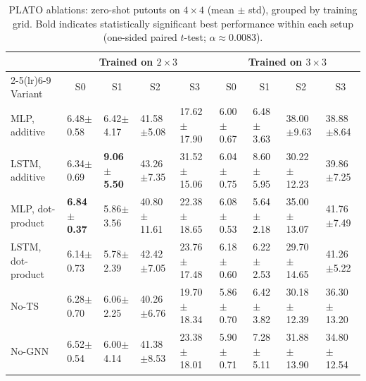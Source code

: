\begin{table}[h]
\centering
\small
\setlength{\tabcolsep}{1.4pt}
\renewcommand{\arraystretch}{1.02}
\begin{tabular}{@{\hspace{2pt}}l|l|l|l|l||l|l|l|l@{\hspace{2pt}}}
\toprule
& \multicolumn{4}{c||}{Trained on $2\times 3$} & \multicolumn{4}{c}{Trained on $3\times 3$} \\
\cmidrule(lr){2-5}\cmidrule(lr){6-9}
Variant & \multicolumn{1}{c|}{S0} & \multicolumn{1}{c|}{S1} & \multicolumn{1}{c|}{S2} & \multicolumn{1}{c||}{S3}
        & \multicolumn{1}{c|}{S0} & \multicolumn{1}{c|}{S1} & \multicolumn{1}{c|}{S2} & \multicolumn{1}{c}{S3} \\
\midrule
MLP, additive      & 6.48$\pm$0.58 & 6.42$\pm$4.17 & 41.58$\pm$5.08 & 17.62$\pm$17.90
                  & 6.00$\pm$0.67 & 6.48$\pm$3.63 & 38.00$\pm$9.63 & 38.88$\pm$8.64 \\
LSTM, additive     & 6.34$\pm$0.69 & \textbf{9.06$\pm$5.50} & 43.26$\pm$7.35 & 31.52$\pm$15.06
                  & 6.04$\pm$0.75 & 8.60$\pm$5.95 & 30.22$\pm$12.23 & 39.86$\pm$7.25 \\
MLP, dot-product   & \textbf{6.84$\pm$0.37} & 5.86$\pm$3.56 & 40.80$\pm$11.61 & 22.38$\pm$18.65
                  & 6.08$\pm$0.53 & 5.64$\pm$2.18 & 35.00$\pm$13.07 & 41.76$\pm$7.49 \\
LSTM, dot-product  & 6.14$\pm$0.73 & 5.78$\pm$2.39 & 42.42$\pm$7.05 & 23.76$\pm$17.48
                  & 6.18$\pm$0.60 & 6.22$\pm$2.53 & 29.70$\pm$14.65 & 41.26$\pm$5.22 \\
No-TS              & 6.28$\pm$0.70 & 6.06$\pm$2.25 & 40.26$\pm$6.76 & 19.70$\pm$18.34
                  & 5.86$\pm$0.70 & 6.42$\pm$3.82 & 30.18$\pm$12.39 & 36.30$\pm$13.20 \\
No-GNN             & 6.52$\pm$0.54 & 6.00$\pm$4.14 & 41.38$\pm$8.53 & 23.38$\pm$18.01
                  & 5.90$\pm$0.71 & 7.28$\pm$5.11 & 31.88$\pm$13.90 & 34.80$\pm$12.54 \\
\bottomrule
\end{tabular}
\caption{PLATO ablations: zero-shot putouts on $4\times 4$ (mean $\pm$ std), grouped by training grid. Bold indicates statistically significant best performance within each setup (one-sided paired $t$-test; $\alpha\approx0.0083$).}
\label{tab:ablate_4x4_putouts_merged}
\end{table}


